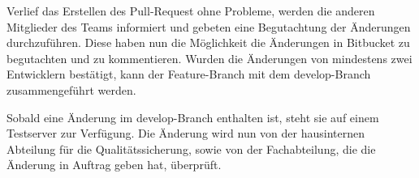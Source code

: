 Verlief das Erstellen des Pull-Request ohne Probleme, werden die anderen Mitglieder des Teams informiert und gebeten eine Begutachtung der Änderungen durchzuführen. Diese haben nun die Möglichkeit die Änderungen in Bitbucket zu begutachten und zu kommentieren. Wurden die Änderungen von mindestens zwei Entwicklern bestätigt, kann der Feature-Branch mit dem develop-Branch zusammengeführt werden. 

Sobald eine Änderung im develop-Branch enthalten ist, steht sie auf einem Testserver zur Verfügung. Die Änderung wird nun von der hausinternen Abteilung für die Qualitätssicherung, sowie von der Fachabteilung, die die Änderung in Auftrag geben hat, überprüft.
